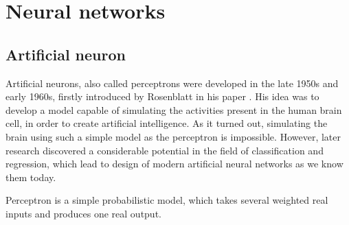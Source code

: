 \chapter{Neural networks}

\section{Artificial neuron}

Artificial neurons, also called perceptrons were developed in the late 1950s and early 1960s, firstly introduced by Rosenblatt in his paper \cite{perceptron}. His idea was to develop a model capable of simulating the activities present in the human brain cell, in order to create artificial intelligence. As it turned out, simulating the brain using such a simple model as the perceptron is impossible. However, later research discovered a considerable potential in the field of classification and regression, which lead to design of modern artificial neural networks as we know them today.

Perceptron\cite{nn_book} is a simple probabilistic model, which takes several weighted real inputs and produces one real output.

\vspace{3mm}

